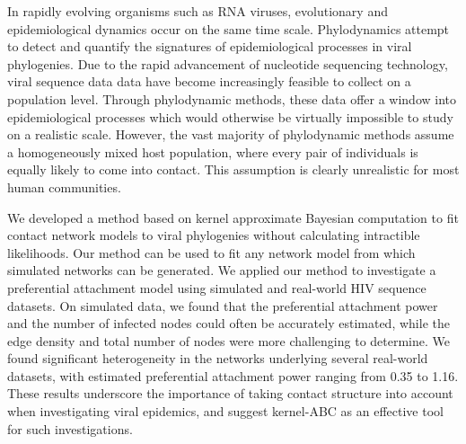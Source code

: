In rapidly evolving organisms such as RNA viruses, evolutionary and
epidemiological dynamics occur on the same time scale. Phylodynamics attempt to
detect and quantify the signatures of epidemiological processes in viral
phylogenies. Due to the rapid advancement of nucleotide sequencing technology,
viral sequence data data have become increasingly feasible to collect on a
population level. Through phylodynamic methods, these data offer a window into
epidemiological processes which would otherwise be virtually impossible to
study on a realistic scale. However, the vast majority of phylodynamic methods
assume a homogeneously mixed host population, where every pair of individuals
is equally likely to come into contact. This assumption is clearly unrealistic
for most human communities.

We developed a method based on kernel approximate Bayesian computation to fit
contact network models to viral phylogenies without calculating intractible
likelihoods. Our method can be used to fit any network model from which
simulated networks can be generated. We applied our method to investigate a
preferential attachment model using simulated and real-world HIV sequence
datasets. On simulated data, we found that the preferential attachment power
and the number of infected nodes could often be accurately estimated, while the
edge density and total number of nodes were more challenging to determine. We
found significant heterogeneity in the networks underlying several real-world
datasets, with estimated preferential attachment power ranging from 0.35 to
1.16. These results underscore the importance of taking contact structure into
account when investigating viral epidemics, and suggest kernel-ABC as an
effective tool for such investigations.

